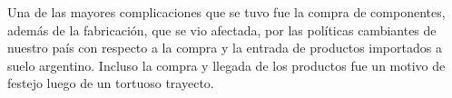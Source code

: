 \medskip

Una de las mayores complicaciones que se tuvo fue la compra de
componentes, además de la fabricación, que se vio afectada, por las políticas cambiantes de
nuestro país con respecto a la compra y la entrada de productos importados a suelo argentino.
Incluso la compra y llegada de los productos fue un motivo de festejo luego de un tortuoso
trayecto.


